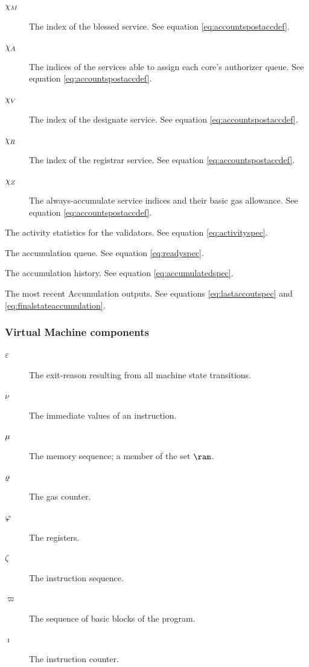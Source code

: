 \begin{description}
  \begin{description}
    \item[$\chi_M$] The index of the blessed service. See equation \ref{eq:accountspostaccdef}.
    \item[$\chi_A$] The indices of the services able to assign each core's authorizer queue. See equation \ref{eq:accountspostaccdef}.
    \item[$\chi_V$] The index of the designate service. See equation \ref{eq:accountspostaccdef}.
    \item[$\chi_R$] The index of the registrar service. See equation \ref{eq:accountspostaccdef}.
    \item[$\chi_Z$] The always-accumulate service indices and their basic gas allowance. See equation \ref{eq:accountspostaccdef}.
  \end{description}
  \item[$\activity$] The activity statistics for the validators. See equation \ref{eq:activityspec}.
  \item[$\ready$] The accumulation queue. See equation \ref{eq:readyspec}.
  \item[$\accumulated$] The accumulation history. See equation \ref{eq:accumulatedspec}.
  \item[$\lastaccout$] The most recent Accumulation outputs. See equations \ref{eq:lastaccoutspec} and \ref{eq:finalstateaccumulation}.
\end{description}

\subsubsection{Virtual Machine components}

\begin{description}
  \item[$\varepsilon$] The exit-reason resulting from all machine state transitions.
  \item[$\nu$] The immediate values of an instruction.
  \item[$\mu$] The memory sequence; a member of the set $\ram$.
  \item[$\varrho$] The gas counter.
  \item[$\varphi$] The registers.
  \item[$\zeta$] The instruction sequence.
  \item[$\varpi$] The sequence of basic blocks of the program.
  \item[$\imath$] The instruction counter.
\end{description}

